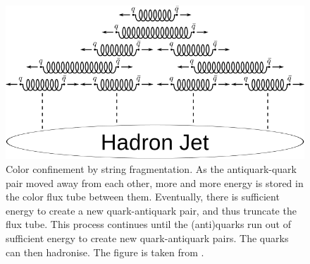 \begin{figure}[h!]
    \centering
    \includegraphics[width=\textwidth]{figures/String_fragmentation.png}
    \caption{Color confinement by string fragmentation. As the antiquark-quark pair moved away from each other, more and more energy is stored in the color flux tube between them. Eventually, there is sufficient energy to create a new quark-antiquark pair, and thus truncate the flux tube. This process continues until the (anti)quarks run out of sufficient energy to create new quark-antiquark pairs. The quarks can then hadronise. The figure is taken from \cite{StringFragmentationGraphic}.}
    \label{fig:IntroStringFragmentation}
\end{figure}




